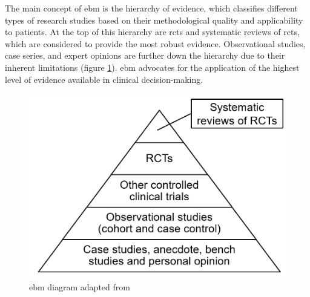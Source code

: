 The main concept of \ac{ebm} is the hierarchy of evidence, which classifies different types of research studies based on their methodological quality and applicability to patients. At the top of this hierarchy are \acp{rct} and systematic reviews of \acp{rct}, which are considered to provide the most robust evidence. Observational studies, case series, and expert opinions are further down the hierarchy due to their inherent limitations (figure \ref{fig:ebm}). \ac{ebm} advocates for the application of the highest level of evidence available in clinical decision-making.
\begin{figure}
    \centering
    \includegraphics[scale=0.55]{figures/ebm.png}
    
    \caption{\acl{ebm} diagram adapted from \cite{greenhalghHowReadPaper2019}} \label{fig:ebm}
    \end{figure}

